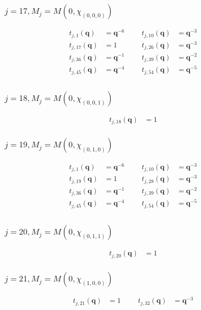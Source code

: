 \subsubsection{$j=17, M_{j}=M(0,\chi_{(0,0,0)})$}
\begin{align*}
t_{j,1}(\boldsymbol{q})&=\boldsymbol{q}^{-6} &&& t_{j,10}(\boldsymbol{q})&=\boldsymbol{q}^{-3} \\
t_{j,17}(\boldsymbol{q})&=1 &&& t_{j,26}(\boldsymbol{q})&=\boldsymbol{q}^{-3} \\
t_{j,36}(\boldsymbol{q})&=\boldsymbol{q}^{-1} &&& t_{j,39}(\boldsymbol{q})&=\boldsymbol{q}^{-2} \\
t_{j,45}(\boldsymbol{q})&=\boldsymbol{q}^{-4} &&& t_{j,54}(\boldsymbol{q})&=\boldsymbol{q}^{-5} \\
\end{align*}

\subsubsection{$j=18, M_{j}=M(0,\chi_{(0,0,1)})$}
\begin{align*}
t_{j,18}(\boldsymbol{q})&=1
\end{align*}

\subsubsection{$j=19, M_{j}=M(0,\chi_{(0,1,0)})$}
\begin{align*}
t_{j,1}(\boldsymbol{q})&=\boldsymbol{q}^{-6} &&& t_{j,10}(\boldsymbol{q})&=\boldsymbol{q}^{-3} \\
t_{j,19}(\boldsymbol{q})&=1 &&& t_{j,28}(\boldsymbol{q})&=\boldsymbol{q}^{-3} \\
t_{j,36}(\boldsymbol{q})&=\boldsymbol{q}^{-1} &&& t_{j,39}(\boldsymbol{q})&=\boldsymbol{q}^{-2} \\
t_{j,45}(\boldsymbol{q})&=\boldsymbol{q}^{-4} &&& t_{j,54}(\boldsymbol{q})&=\boldsymbol{q}^{-5} \\
\end{align*}

\subsubsection{$j=20, M_{j}=M(0,\chi_{(0,1,1)})$}
\begin{align*}
t_{j,20}(\boldsymbol{q})&=1
\end{align*}

\subsubsection{$j=21, M_{j}=M(0,\chi_{(1,0,0)})$}
\begin{align*}
t_{j,21}(\boldsymbol{q})&=1 &&& t_{j,32}(\boldsymbol{q})&=\boldsymbol{q}^{-3} \\
\end{align*}

